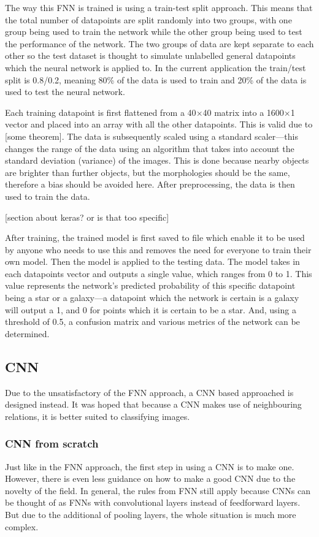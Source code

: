 \documentclass[a4paper,fleqn,usenatbib]{mnras}
\begin{document}
The way this FNN is trained is using a train-test split approach. This means that the total number of datapoints are split randomly into two groups, with one group being used to train the network while the other group being used to test the performance of the network. The two groups of data are kept separate to each other so the test dataset is thought to simulate unlabelled general datapoints which the neural network is applied to. In the current application the train/test split is 0.8/0.2, meaning 80\% of the data is used to train and 20\% of the data is used to test the neural network. 

Each training datapoint is first flattened from a 40$\times$40 matrix into a 1600$\times$1 vector and placed into an array with all the other datapoints. This is valid due to [some theorem]. The data is subsequently scaled using a standard scaler---this changes the range of the data using an algorithm that takes into account the standard deviation (variance) of the images. This is done because nearby objects are brighter than further objects, but the morphologies should be the same, therefore a bias should be avoided here. After preprocessing, the data is then used to train the data. 

[section about keras? or is that too specific]

After training, the trained model is first saved to file which enable it to be used by anyone who needs to use this and removes the need for everyone to train their own model. Then the model is applied to the testing data. The model takes in each datapoints vector and outputs a single value, which ranges from 0 to 1. This value represents the network's predicted probability of this specific datapoint being a star or a galaxy---a datapoint which the network is certain is a galaxy will output a 1, and 0 for points which it is certain to be a star. And, using a threshold of 0.5, a confusion matrix and various metrics of the network can be determined. 
\subsection{CNN}
Due to the unsatisfactory of the FNN approach, a CNN based approached is designed instead. It was hoped that because a CNN makes use of neighbouring relations, it is better suited to classifying images. 
\subsubsection{CNN from scratch}
Just like in the FNN approach, the first step in using a CNN is to make one. However, there is even less guidance on how to make a good CNN due to the novelty of the field. In general, the rules from FNN still apply because CNNs can be thought of as FNNs with convolutional layers instead of feedforward layers. But due to the additional of pooling layers, the whole situation is much more complex. 
\end{document}
